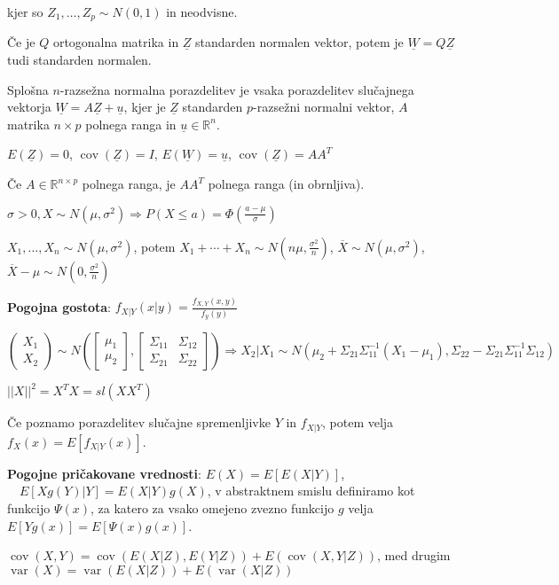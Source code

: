 \documentclass[11pt,a4paper]{amsart}
\theoremstyle{definition} %
\theoremstyle{plain} %
\newcommand{\R}{\mathbb R}
\newcommand{\Z}{\underline{Z}}
\newcommand{\W}{\underline{W}}
\newcommand{\uu}{\underline{u}}
\DeclareMathOperator{\cov}{cov}
\DeclareMathOperator{\var}{var}
\begin{document}
  kjer so $Z_1, \ldots , Z_p \sim N(0,1)$ in neodvisne.

Če je $Q$ ortogonalna matrika in $\Z$ standarden normalen vektor,
potem je $\W = Q\Z$ tudi standarden normalen.

Splošna $n$-razsežna normalna porazdelitev je vsaka porazdelitev slučajnega
vektorja $\W = A\Z+\uu$, kjer je $\Z$
standarden $p$-razsežni normalni vektor, $A$ matrika $n \times p$ polnega ranga
in $\uu \in \R^n$.

$E(\Z) = 0$, $\cov(\Z) = I$, $E(\underline{W}) =
\uu$, $\cov(\Z) = AA^T$

Če $A \in \R^{n\times p}$ polnega ranga, je $AA^T$ polnega ranga (in obrnljiva).

$\sigma > 0, X \sim N(\mu, \sigma^2 ) \Longrightarrow P(X \leq a ) = \Phi
(\frac{a-\mu}{\sigma})$

$X_1,\ldots, X_n \sim N(\mu, \sigma^2)$, potem $X_1  + \cdots +  X_n \sim N(n\mu, \frac{\sigma^2}{n})$, $\overline{X} \sim N(\mu, \sigma^2)$, $\overline{X} - \mu \sim N(0, \frac{\sigma^2}{n})$

\textbf{Pogojna gostota}: $f_{X|Y}(x|y) = \frac{f_{X,Y}(x,y)}{f_y (y)}$

$\left( \begin{matrix} X_1 \\ X_2 \end{matrix} \right)
\sim
N \left(
\left[ \begin{matrix} \mu_1 \\ \mu_2 \end{matrix} \right],
\left[ \begin{matrix} \Sigma_{11} & \Sigma_{12} \\ \Sigma_{21} & \Sigma_{22} \end{matrix} \right] \right)
\Longrightarrow
X_2 | X_1 \sim N(\mu_2 +  \Sigma_{21}\Sigma_{11}^{-1} (X_1 - \mu_1), \Sigma_{22} - \Sigma_{21} \Sigma_{11}^{-1} \Sigma_{12} )$

$||X||^2 = X^T X = sl(XX^T)$

Če poznamo porazdelitev slučajne spremenljivke $Y$ in $f_{X|Y}$, potem velja
$f_X(x) = E[f_{X|Y}(x)]$.

\textbf{Pogojne pričakovane vrednosti}: $E(X) = E[E(X|Y)]$, $ \quad E[Xg(Y)|Y] =
E(X|Y)g(X)$, v abstraktnem smislu definiramo kot funkcijo $\Psi(x)$, za katero
za vsako omejeno zvezno funkcijo $g$ velja $E[Yg(x)]=E[\Psi(x)g(x)]$.

$\cov(X,Y) = \cov(E(X|Z),E(Y|Z)) + E(\cov(X,Y|Z))$, med drugim $\var(X) =
\var(E(X|Z)) + E(\var(X|Z))$
\end{document}
